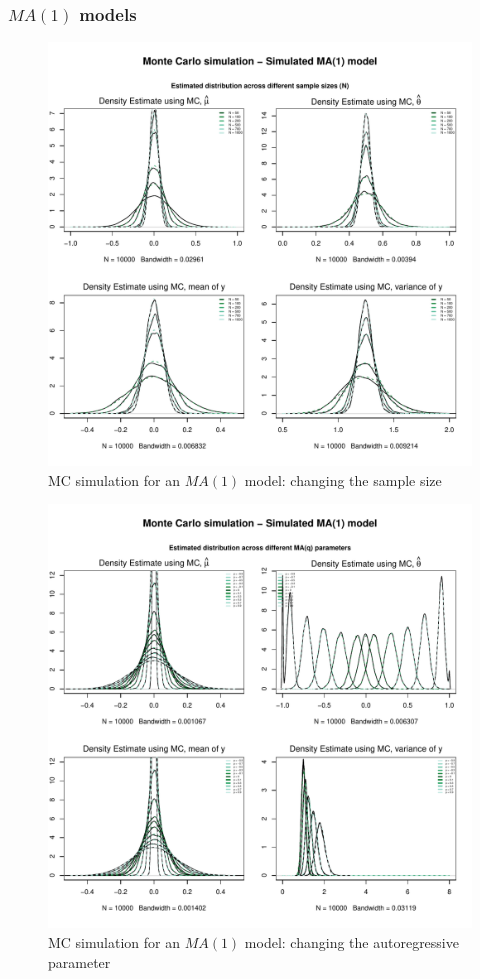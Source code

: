 \documentclass{article}
\begin{document}
\clearpage
\subsubsection{$MA(1)$ models}
\begin{figure}[hbt!]
\includegraphics[width=\textwidth]{plots/MC_MA1_densities_diff_smpl}
\caption{MC simulation for an $MA(1)$ model: changing the sample size}
\label{fig:MC_MA1_densities_diff_smpl}
\centering
\end{figure}

\begin{figure}[hbt!]
\includegraphics[width=\textwidth]{plots/MC_MA1_densities_diff_ARq}
\caption{MC simulation for an $MA(1)$ model: changing the autoregressive parameter}
\label{fig:MC_MA1_densities_diff_ARq}
\centering
\end{figure}
\end{document}
